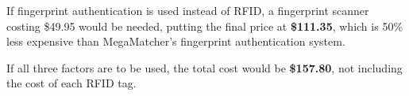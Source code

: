 If fingerprint authentication is used instead of RFID, a fingerprint scanner costing \$49.95 would be needed, putting the final price at \textbf{\$111.35}, which is 50\% less expensive than MegaMatcher's fingerprint authentication system.

If all three factors are to be used, the total cost would be \textbf{\$157.80}, not including the cost of each RFID tag.
